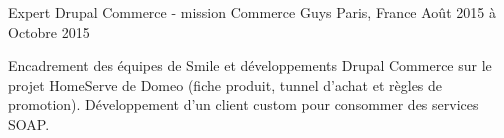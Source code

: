\cventry
{Expert Drupal Commerce - mission} %
{Commerce Guys} %
{Paris, France} %
{Août 2015 à Octobre 2015} %
{
\begin{cvitems} %
    \item
    {
    Encadrement des équipes de Smile et développements Drupal Commerce sur le projet
    HomeServe de Domeo (fiche produit, tunnel d'achat et règles de promotion).
    Développement d'un client custom pour consommer des services SOAP.
    }
\end{cvitems}
}

